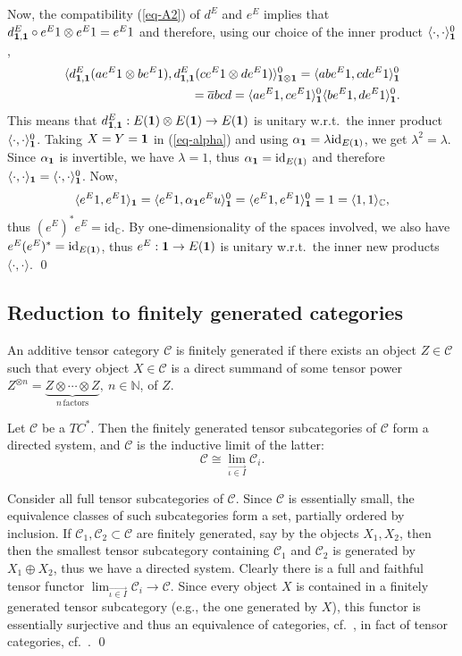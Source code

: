 \documentclass[11pt]{article}
\theoremstyle{definition}
\theoremstyle{definition}
\theoremstyle{remark}
\def\2#1{{\mathcal #1}}
\def\7#1{{\mathbb #1}}
\def\1#1{{\bf #1}}
\def\ol#1{{\overline #1}}
\newcommand{\rarr}{\rightarrow}
\def\id{\mathrm{id}}
\begin{document}
Now, the compatibility (\ref{eq-A2}) of $d^E$ and $e^E$ implies that
$d^E_{\11,\11}\circ e^E1\otimes e^E1=e^E1$ and therefore, using our
choice of the inner product $\langle\cdot,\cdot\rangle_\11^0$,
\begin{eqnarray*} \langle d^E_{\11,\11}(ae^E1\otimes be^E1),d^E_{\11,\11}(ce^E1\otimes de^E1)\rangle^0_{\11\otimes\11}
   = \langle abe^E1,cde^E1\rangle^0_\11 \\
 =\ol{ab}cd 
  = \langle ae^E1,ce^E1\rangle^0_\11\langle
  be^E1,de^E1\rangle^0_\11. \end{eqnarray*}
This means that $d^E_{\11,\11}:E(\11)\otimes E(\11)\rarr E(\11)$ is unitary w.r.t.\ the inner
product $\langle\cdot,\cdot\rangle_\11^0$. Taking $X=Y=\11$ in (\ref{eq-alpha}) and using
$\alpha_\11=\lambda\id_{E(\11)}$, we get $\lambda^2=\lambda$. Since $\alpha_\11$ is invertible, we have
$\lambda=1$, thus $\alpha_\11=\id_{E(\11)}$ and therefore
$\langle\cdot,\cdot\rangle_\11=\langle\cdot,\cdot\rangle_\11^0$. Now,
\[ \langle e^E 1,e^E1\rangle_\11=\langle e^E
1,\alpha_\11e^Eu\rangle^0_\11 =\langle e^E
1,e^E1\rangle^0_\11=1=\langle1,1\rangle_\7C, \] thus
$(e^E)^*e^E=\id_\7C$. By one-dimensionality of the spaces involved, we
also have $e^E(e^E)^*=\id_{E(\11)}$, thus $e^E:\11\rarr E(\11)$ is
unitary w.r.t.\ the inner new products $\langle\cdot,\cdot\rangle$.
\qed





\subsection{Reduction to finitely generated categories}
\label{ss-fingen} \bdefin {} An additive
tensor category $\2C$ is finitely generated if there exists an object
$Z\in\2C$ such that every object $X\in\2C$ is a direct summand of some
tensor power $Z^{\otimes n}=\underbrace{Z\otimes\cdots\otimes
  Z}_{n\,\mathrm{factors}},\ n\in\7N$, of $Z$.  \edefin

\blemma \label{lem-ind}
Let $\2C$ be a $TC^*$. Then the finitely generated tensor subcategories of $\2C$ form a directed
system, and $\2C$ is the inductive limit of the latter:
\[ \2C\cong\lim_{\stackrel{\longrightarrow}{\iota\in I}} \2C_i. \]
\elemma

\prf Consider all full tensor subcategories of $\2C$. Since $\2C$ is
essentially small, the equivalence classes of such subcategories form
a set, partially ordered by inclusion.  If $\2C_1,\2C_2\subset\2C$ are
finitely generated, say by the objects $X_1,X_2$, then then the
smallest tensor subcategory containing $\2C_1$ and $\2C_2$ is
generated by $X_1\oplus X_2$, thus we have a directed system. Clearly
there is a full and faithful tensor functor
$\lim_{\stackrel{\longrightarrow}{\iota\in I}}\2C_i\rarr\2C$. Since
every object $X$ is contained in a finitely generated tensor
subcategory (e.g., the one generated by $X$), this functor is
essentially surjective and thus an equivalence of categories, cf.\
\cite{cwm}, in fact of tensor categories, cf.\ \cite{SR}.  \qed
\end{document}
